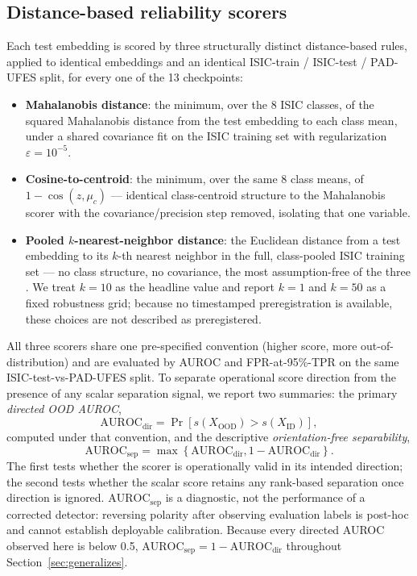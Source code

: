 \subsection{Distance-based reliability scorers}
\label{sec:scorers}

Each test embedding is scored by three structurally distinct distance-based rules, applied to identical embeddings and an identical ISIC-train / ISIC-test / PAD-UFES split, for every one of the 13 checkpoints:

\begin{itemize}
\item \textbf{Mahalanobis distance}: the minimum, over the 8 ISIC classes, of the squared Mahalanobis distance from the test embedding to each class mean, under a shared covariance fit on the ISIC training set with regularization $\varepsilon = 10^{-5}$.
\item \textbf{Cosine-to-centroid}: the minimum, over the same 8 class means, of $1 - \cos(z, \mu_c)$ --- identical class-centroid structure to the Mahalanobis scorer with the covariance/precision step removed, isolating that one variable.
\item \textbf{Pooled $k$-nearest-neighbor distance}: the Euclidean distance from a test embedding to its $k$-th nearest neighbor in the full, class-pooled ISIC training set --- no class structure, no covariance, the most assumption-free of the three \citep{sun2022knn}. We treat $k = 10$ as the headline value and report $k = 1$ and $k = 50$ as a fixed robustness grid; because no timestamped preregistration is available, these choices are not described as preregistered.
\end{itemize}

All three scorers share one pre-specified convention (higher score, more out-of-distribution) and are evaluated by AUROC and FPR-at-95\%-TPR on the same ISIC-test-vs-PAD-UFES split. To separate operational score direction from the presence of any scalar separation signal, we report two summaries: the primary \emph{directed OOD AUROC},
\begin{equation}
\mathrm{AUROC}_{\mathrm{dir}} = \Pr\!\left[s(X_{\mathrm{OOD}})>s(X_{\mathrm{ID}})\right],
\label{eq:auroc-directed}
\end{equation}
computed under that convention, and the descriptive \emph{orientation-free separability},
\begin{equation}
\mathrm{AUROC}_{\mathrm{sep}} = \max\!\left\{\mathrm{AUROC}_{\mathrm{dir}},1-\mathrm{AUROC}_{\mathrm{dir}}\right\}.
\label{eq:auroc-separability}
\end{equation}
The first tests whether the scorer is operationally valid in its intended direction; the second tests whether the scalar score retains any rank-based separation once direction is ignored. $\mathrm{AUROC}_{\mathrm{sep}}$ is a diagnostic, not the performance of a corrected detector: reversing polarity after observing evaluation labels is post-hoc and cannot establish deployable calibration. Because every directed AUROC observed here is below 0.5, $\mathrm{AUROC}_{\mathrm{sep}}=1-\mathrm{AUROC}_{\mathrm{dir}}$ throughout Section~\ref{sec:generalizes}.

